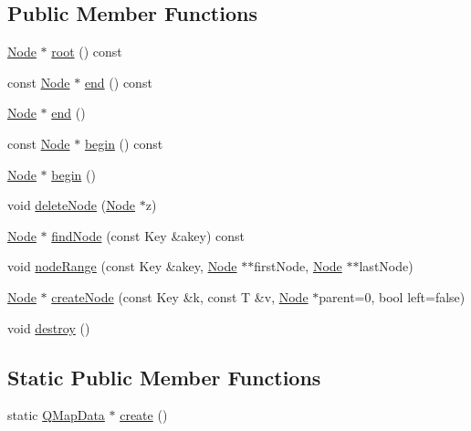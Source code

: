 \subsection*{Public Member Functions}
\begin{DoxyCompactItemize}
\item 
\hyperlink{struct_q_map_data_a9e453de3cc687c14a51c4145bb5959c3}{Node} $\ast$ \hyperlink{struct_q_map_data_a124ed4fc317d52caec1cb25eb6056b61}{root} () const 
\item 
const \hyperlink{struct_q_map_data_a9e453de3cc687c14a51c4145bb5959c3}{Node} $\ast$ \hyperlink{struct_q_map_data_af4fbffb9172db96d69939747cd8ce6c2}{end} () const 
\item 
\hyperlink{struct_q_map_data_a9e453de3cc687c14a51c4145bb5959c3}{Node} $\ast$ \hyperlink{struct_q_map_data_acae8f9f98450b173a91afd1b2f902aa0}{end} ()
\item 
const \hyperlink{struct_q_map_data_a9e453de3cc687c14a51c4145bb5959c3}{Node} $\ast$ \hyperlink{struct_q_map_data_a8d1858c933d70868bf3e622ee64e34ab}{begin} () const 
\item 
\hyperlink{struct_q_map_data_a9e453de3cc687c14a51c4145bb5959c3}{Node} $\ast$ \hyperlink{struct_q_map_data_a9f336a5bc3a4e11815c0af5fb114d0da}{begin} ()
\item 
void \hyperlink{struct_q_map_data_a4b634f0177f4b09665c922560b630626}{delete\+Node} (\hyperlink{struct_q_map_data_a9e453de3cc687c14a51c4145bb5959c3}{Node} $\ast$z)
\item 
\hyperlink{struct_q_map_data_a9e453de3cc687c14a51c4145bb5959c3}{Node} $\ast$ \hyperlink{struct_q_map_data_a7a1d40fcd919b691d655912de6302706}{find\+Node} (const Key \&akey) const 
\item 
void \hyperlink{struct_q_map_data_a976acbd12ec6c68605e4cac30d57a57f}{node\+Range} (const Key \&akey, \hyperlink{struct_q_map_data_a9e453de3cc687c14a51c4145bb5959c3}{Node} $\ast$$\ast$first\+Node, \hyperlink{struct_q_map_data_a9e453de3cc687c14a51c4145bb5959c3}{Node} $\ast$$\ast$last\+Node)
\item 
\hyperlink{struct_q_map_data_a9e453de3cc687c14a51c4145bb5959c3}{Node} $\ast$ \hyperlink{struct_q_map_data_ae38d9e8096ad2175aeb788bb9ea6d5eb}{create\+Node} (const Key \&k, const T \&v, \hyperlink{struct_q_map_data_a9e453de3cc687c14a51c4145bb5959c3}{Node} $\ast$parent=0, bool left=false)
\item 
void \hyperlink{struct_q_map_data_a72c88a1d07fc5f31e989a329150ad96d}{destroy} ()
\end{DoxyCompactItemize}
\subsection*{Static Public Member Functions}
\begin{DoxyCompactItemize}
\item 
static \hyperlink{struct_q_map_data}{Q\+Map\+Data} $\ast$ \hyperlink{struct_q_map_data_ae855aaf71b9ee04929ebf852c1703074}{create} ()
\end{DoxyCompactItemize}
